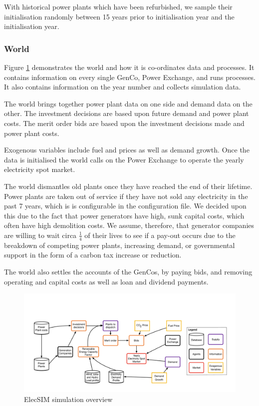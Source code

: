 With historical power plants which have been refurbished, we sample their initialisation randomly between 15 years prior to initialisation year and the initialisation year.

\subsubsection{World}

Figure \ref{fig:lowlevelsystem} demonstrates the world and how it is co-ordinates data and processes. It contains information on every single GenCo, Power Exchange, and runs processes. It also contains information on the year number and collects simulation data.

The world brings together power plant data on one side and demand data on the other. The investment decisions are based upon future demand and power plant costs. The merit order bids are based upon the investment decisions made and power plant costs.

Exogenous variables include fuel and  prices as well as demand growth. Once the data is initialised the world calls on the Power Exchange to operate the yearly electricity spot market.

The world dismantles old plants once they have reached the end of their lifetime. Power plants are taken out of service if they have not sold any electricity in the past 7 years, which is is configurable in the configuration file. We decided upon this due to the fact that power generators have high, sunk capital costs, which often have high demolition costs. We assume, therefore, that generator companies are willing to wait circa $\frac{1}{4}$ of their lives to see if a pay-out occurs due to the breakdown of competing power plants, increasing demand, or governmental support in the form of a carbon tax increase or reduction.

The world also settles the accounts of the GenCos, by paying bids, and removing operating and capital costs as well as loan and dividend payments.

\begin{figure}
	\centering
	\includegraphics[width=0.97\linewidth]{figures/low_level_system}
	\caption{ElecSIM simulation overview}
	\label{fig:lowlevelsystem}
\end{figure}


